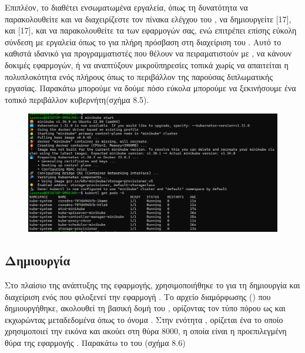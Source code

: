 Επιπλέον, το  
διαθέτει ενσωματωμένα εργαλεία, όπως τη δυνατότητα να παρακολουθείτε
και να διαχειρίζεστε τον πίνακα ελέγχου του , 
να δημιουργείτε [17], και [17], και 
να παρακολουθείτε τα  των εφαρμογών σας, ενώ επιτρέπει 
επίσης εύκολη σύνδεση με εργαλεία όπως το  
για πλήρη πρόσβαση στη διαχείριση του . 
Αυτό το καθιστά ιδανικό για προγραμματιστές που θέλουν να 
πειραματιστούν με , 
να κάνουν δοκιμές εφαρμογών, ή να αναπτύξουν μικροϋπηρεσίες 
τοπικά χωρίς να απαιτείται η πολυπλοκότητα ενός πλήρους 
όπως το περιβάλλον της παρούσας διπλωματικής εργασίας. Παρακάτω μπορούμε να δούμε 
πόσο εύκολα μπορούμε να ξεκινήσουμε ένα τοπικό περιβάλλον κυβερνήτη(σχήμα 8.5).


\begin{figure}[h]
	\centering
	\includegraphics[width=1.5\textwidth]{graphics/minikube_deployment_k8s.png}
	\caption{}
\end{figure}

\subsection{Δημιουργία }

Στο πλαίσιο της ανάπτυξης της εφαρμογής, χρησιμοποιήθηκε το 
 για τη δημιουργία και διαχείριση ενός  
που φιλοξενεί την εφαρμογή . Το αρχείο διαμόρφωσης 
() που δημιουργήθηκε, ακολουθεί τη βασική δομή του , 
ορίζοντας τον τύπο πόρου ως  και 
εκχωρώντας μεταδεδομένα όπως το όνομα . 
Στην ενότητα , ορίζεται ένα  
το οποίο χρησιμοποιεί την εικόνα  
και ακούει στη θύρα 8000, η οποία είναι η προεπιλεγμένη θύρα της 
εφαρμογής . Παρακάτω το  του (σχήμα 8.6)


